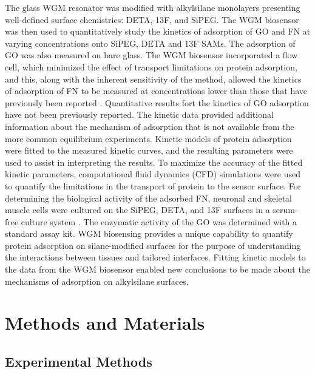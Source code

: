 The glass WGM resonator was modified with alkylsilane monolayers presenting
well-defined surface chemistries: DETA, 13F, and SiPEG. The WGM biosensor
was then used to quantitatively study the kinetics of adsorption of
GO and FN at varying concentrations onto SiPEG, DETA and 13F SAMs.
The adsorption of GO was also measured on bare glass. The WGM biosensor
incorporated a flow cell, which minimized the effect of transport
limitations on protein adsorption, and this, along with the inherent
sensitivity of the method, allowed the kinetics of adsorption of FN
to be measured at concentrations lower than those that have previously
been reported \cite{Michael2003}. Quantitative results fort the kinetics
of GO adsorption have not been previously reported. The kinetic data
provided additional information about the mechanism of adsorption
that is not available from the more common equilibrium experiments.
Kinetic models of protein adsorption were fitted to the measured kinetic
curves, and the resulting parameters were used to assist in interpreting
the results. To maximize the accuracy of the fitted kinetic parameters,
computational fluid dynamics (CFD) simulations were used to quantify
the limitations in the transport of protein to the sensor surface.
For determining the biological activity of the adsorbed FN, neuronal
and skeletal muscle cells were cultured on the SiPEG, DETA, and 13F
surfaces in a serum-free culture system \cite{Brewer1995,Das2007}.
The enzymatic activity of the GO was determined with a standard assay
kit. WGM biosensing provides a unique capability to quantify protein
adsorption on silane-modified surfaces for the purpose of understanding
the interactions between tissues and tailored interfaces. Fitting
kinetic models to the data from the WGM biosensor enabled new conclusions
to be made about the mechanisms of adsorption on alkylsilane surfaces.


\section{Methods and Materials}


\subsection{Experimental Methods}

